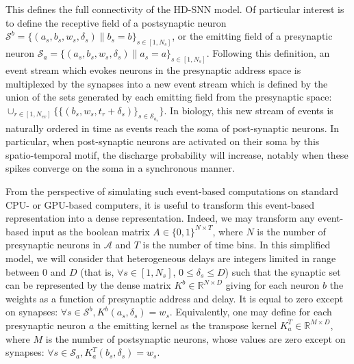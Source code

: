 \documentclass[runningheads]{llncs}
\newcommand{\presynaddr}{a} %
\newcommand{\postsynaddr}{b} %
\newcommand{\numevent}{N_{ev}} %
\newcommand{\presynaddrspace}{\mathcal{A}} %
\newcommand{\arank}{r} %
\newcommand{\synapse}{\mathcal{S}} %
\newcommand{\synapticweight}{w} %
\newcommand{\synapticdelay}{\delta} %
\newcommand{\ranksyn}{s} %
\newcommand{\Nsyn}{N_{s}} %
\newcommand{\timev}{t} %
\newcommand{\kernel}{K} %
\begin{document}
This defines the full connectivity of the HD-SNN model. Of particular interest is to define the receptive field of a postsynaptic neuron $\synapse^\postsynaddr =  \{(\presynaddr_\ranksyn, \postsynaddr_\ranksyn, \synapticweight_\ranksyn, \synapticdelay_\ranksyn) \| \postsynaddr_\ranksyn=\postsynaddr\}_{\ranksyn \in [1,\Nsyn]} $, or the emitting field of a presynaptic neuron $\synapse_\presynaddr =  \{(\presynaddr_\ranksyn, \postsynaddr_\ranksyn, \synapticweight_\ranksyn, \synapticdelay_\ranksyn) \| \presynaddr_\ranksyn=\presynaddr\}_{\ranksyn \in [1,\Nsyn]}$. Following this definition, an event stream which evokes neurons in the presynaptic address space is multiplexed by the synapses into a new event stream which is defined by the union of the sets generated by each emitting field from the presynaptic space: 
$ \cup_{\arank \in [1,\numevent]} \{ \{(\postsynaddr_\ranksyn, \synapticweight_\ranksyn, \timev_\arank + \synapticdelay_\ranksyn) \}_{ \ranksyn \in \synapse_{\presynaddr_\arank}} \}$. In biology, this new stream of events is naturally ordered in time as events reach the soma of post-synaptic neurons. In particular, when post-synaptic neurons are activated on their soma by this spatio-temporal motif, the discharge probability will increase, notably when these spikes converge on the soma in a synchronous manner. 

From the perspective of simulating such event-based computations on standard CPU- or GPU-based computers, it is useful to transform this event-based representation into a dense representation. Indeed, we may transform any event-based input as the boolean matrix $A \in \{0, 1 \}^{N\times T}$, where $N$ is the number of presynaptic neurons in $\presynaddrspace$ and $T$ is the number of time bins. In this simplified model, we will consider that heterogeneous delays are integers limited in range between $0$ and $D$ (that is, $\forall {\ranksyn \in [1,\Nsyn]}$, $0 \le \synapticdelay_\ranksyn \le D$) such that the synaptic set can be represented by the dense matrix $\kernel^\postsynaddr \in \mathbb{R}^{N\times D}$ giving for each neuron $\postsynaddr$ the weights as a function of presynaptic address and delay. It is equal to zero except on synapses: $\forall {\ranksyn \in \synapse^\postsynaddr}, \kernel^\postsynaddr(\presynaddr_\ranksyn,  \synapticdelay_\ranksyn) = \synapticweight_\ranksyn$. Equivalently, one may define for each presynaptic neuron $\presynaddr$ the emitting kernel as the transpose kernel $\kernel^T_\presynaddr \in \mathbb{R}^{M\times D}$, where $M$ is the number of postsynaptic neurons, whose values are zero except on synapses:  $\forall {\ranksyn \in \synapse_\presynaddr}, \kernel^T_\presynaddr(\postsynaddr_\ranksyn,  \synapticdelay_\ranksyn) = \synapticweight_\ranksyn$.
\end{document}
